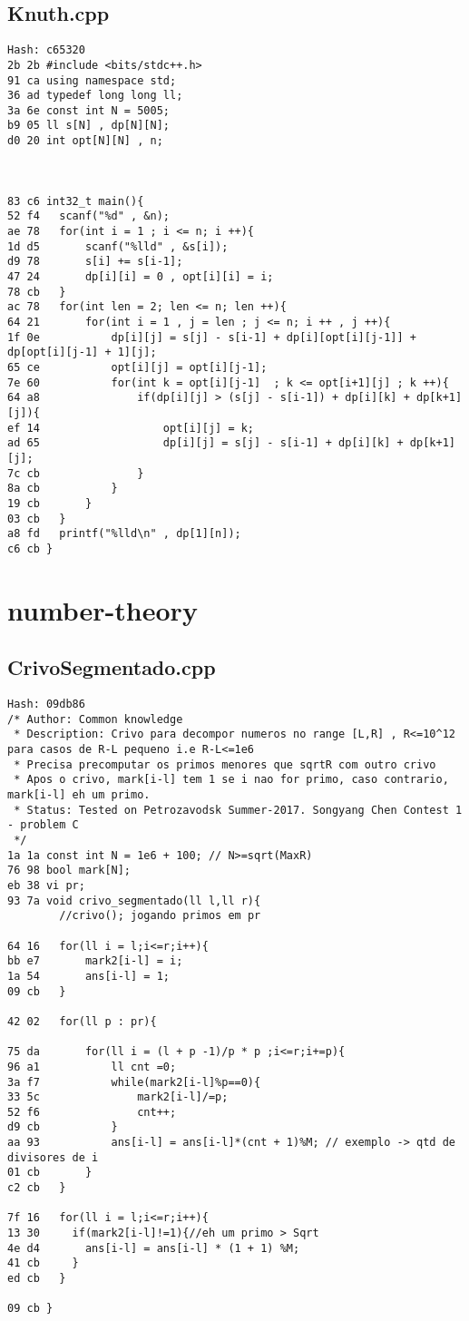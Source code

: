 \documentclass[11pt, a4paper, twoside]{article}
\begin{document}
\subsection{Knuth.cpp}
\begin{lstlisting}
Hash: c65320
2b 2b #include <bits/stdc++.h>
91 ca using namespace std;
36 ad typedef long long ll;
3a 6e const int N = 5005;
b9 05 ll s[N] , dp[N][N];
d0 20 int opt[N][N] , n;
 
 
 
83 c6 int32_t main(){
52 f4 	scanf("%d" , &n);
ae 78 	for(int i = 1 ; i <= n; i ++){
1d d5 		scanf("%lld" , &s[i]);
d9 78 		s[i] += s[i-1];
47 24 		dp[i][i] = 0 , opt[i][i] = i;
78 cb 	}
ac 78 	for(int len = 2; len <= n; len ++){
64 21 		for(int i = 1 , j = len ; j <= n; i ++ , j ++){
1f 0e 			dp[i][j] = s[j] - s[i-1] + dp[i][opt[i][j-1]] + dp[opt[i][j-1] + 1][j];
65 ce 			opt[i][j] = opt[i][j-1];
7e 60 			for(int k = opt[i][j-1]  ; k <= opt[i+1][j] ; k ++){
64 a8 				if(dp[i][j] > (s[j] - s[i-1]) + dp[i][k] + dp[k+1][j]){
ef 14 					opt[i][j] = k;
ad 65 					dp[i][j] = s[j] - s[i-1] + dp[i][k] + dp[k+1][j];
7c cb 				}
8a cb 			}
19 cb 		}
03 cb 	}
a8 fd 	printf("%lld\n" , dp[1][n]);
c6 cb }
\end{lstlisting}



%
%

\section{number-theory}

\subsection{CrivoSegmentado.cpp}
\begin{lstlisting}
Hash: 09db86
/* Author: Common knowledge
 * Description: Crivo para decompor numeros no range [L,R] , R<=10^12 para casos de R-L pequeno i.e R-L<=1e6
 * Precisa precomputar os primos menores que sqrtR com outro crivo
 * Apos o crivo, mark[i-l] tem 1 se i nao for primo, caso contrario, mark[i-l] eh um primo.
 * Status: Tested on Petrozavodsk Summer-2017. Songyang Chen Contest 1 - problem C
 */
1a 1a const int N = 1e6 + 100; // N>=sqrt(MaxR)
76 98 bool mark[N];
eb 38 vi pr;
93 7a void crivo_segmentado(ll l,ll r){
      	//crivo(); jogando primos em pr
        
64 16 	for(ll i = l;i<=r;i++){
bb e7 		mark2[i-l] = i;
1a 54 		ans[i-l] = 1;
09 cb 	}
      
42 02 	for(ll p : pr){
      	  
75 da 		for(ll i = (l + p -1)/p * p ;i<=r;i+=p){
96 a1 			ll cnt =0;
3a f7 			while(mark2[i-l]%p==0){
33 5c 				mark2[i-l]/=p;
52 f6 				cnt++;
d9 cb 			}
aa 93 			ans[i-l] = ans[i-l]*(cnt + 1)%M; // exemplo -> qtd de divisores de i
01 cb 		}
c2 cb 	}
      	
7f 16 	for(ll i = l;i<=r;i++){
13 30 	  if(mark2[i-l]!=1){//eh um primo > Sqrt
4e d4 		ans[i-l] = ans[i-l] * (1 + 1) %M;    
41 cb 	  }
ed cb 	}
        
09 cb }
\end{lstlisting}
\end{document}
